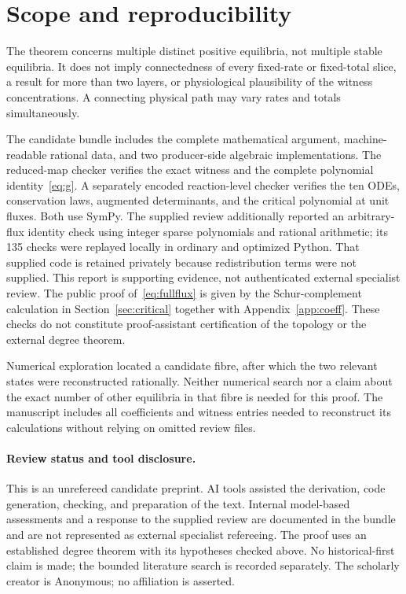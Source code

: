 \documentclass[11pt,a4paper]{article}
\numberwithin{equation}{section}
\theoremstyle{remark}\newtheorem{remark}[theorem]{Remark}
\begin{document}
\section{Scope and reproducibility}\label{sec:reproduce}
The theorem concerns multiple distinct positive equilibria, not multiple stable equilibria. It does not imply connectedness of every fixed-rate or fixed-total slice, a result for more than two layers, or physiological plausibility of the witness concentrations. A connecting physical path may vary rates and totals simultaneously.

The candidate bundle includes the complete mathematical argument, machine-readable rational data, and two producer-side algebraic implementations. The reduced-map checker verifies the exact witness and the complete polynomial identity~\eqref{eq:g}. A separately encoded reaction-level checker verifies the ten ODEs, conservation laws, augmented determinants, and the critical polynomial at unit fluxes. Both use SymPy. The supplied review additionally reported an arbitrary-flux identity check using integer sparse polynomials and rational arithmetic; its 135 checks were replayed locally in ordinary and optimized Python. That supplied code is retained privately because redistribution terms were not supplied. This report is supporting evidence, not authenticated external specialist review. The public proof of~\eqref{eq:fullflux} is given by the Schur-complement calculation in Section~\ref{sec:critical} together with Appendix~\ref{app:coeff}. These checks do not constitute proof-assistant certification of the topology or the external degree theorem.

Numerical exploration located a candidate fibre, after which the two relevant states were reconstructed rationally. Neither numerical search nor a claim about the exact number of other equilibria in that fibre is needed for this proof. The manuscript includes all coefficients and witness entries needed to reconstruct its calculations without relying on omitted review files.

\paragraph{Review status and tool disclosure.}
This is an unrefereed candidate preprint. AI tools assisted the derivation, code generation, checking, and preparation of the text. Internal model-based assessments and a response to the supplied review are documented in the bundle and are not represented as external specialist refereeing. The proof uses an established degree theorem with its hypotheses checked above. No historical-first claim is made; the bounded literature search is recorded separately. The scholarly creator is Anonymous; no affiliation is asserted.
\end{document}
